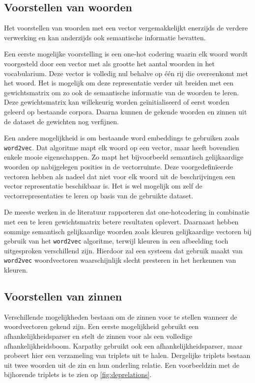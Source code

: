 \subsection{Voorstellen van woorden}
 Het voorstellen van woorden met een vector vergemakkelijkt enerzijds de verdere verwerking en kan anderzijds ook semantische informatie bevatten.

 Een eerste mogelijke voorstelling is een one-hot codering waarin elk woord wordt voorgesteld door een vector met als grootte het aantal woorden in het vocabularium. Deze vector is volledig nul behalve op \'e\'en rij die overeenkomt met het woord. Het is mogelijk om deze representatie verder uit breiden met een gewichtsmatrix om zo ook de semantische informatie van de woorden te leren. Deze gewichtsmatrix kan willekeurig worden ge\"initialiseerd of eerst worden geleerd op bestaande corpora\cite{Lebret2013,Mao2014a,Google}. Daarna kunnen de gekende woorden en zinnen uit de dataset de gewichten nog verfijnen.  

 Een andere mogelijkheid is om bestaande word embeddings te gebruiken zoals \texttt{word2vec}. Dat algoritme mapt elk woord op een vector, maar heeft bovendien enkele mooie eigenschappen. Zo mapt het bijvoorbeeld semantisch gelijkaardige woorden op nabijgelegen posities in de vectorruimte\cite{Mikolov2013}. Deze voorgedefin\"ieerde vectoren hebben als nadeel dat niet voor elk woord uit de beschrijvingen een vector representatie beschikbaar is. Het is wel mogelijk om zelf de vectorrepresentaties te leren op basis van de gebruikte dataset.

 De meeste werken in de literatuur rapporteren dat one-hotcodering in combinatie met een te leren gewichtsmatrix betere resultaten oplevert. Daarnaast hebben sommige semantisch gelijkaardige woorden zoals kleuren gelijkaardige vectoren bij gebruik van het \texttt{word2vec} algoritme, terwijl kleuren in een afbeelding toch uitgesproken verschillend zijn. Hierdoor zal een systeem dat gebruik maakt van \texttt{word2vec} woordvectoren waarschijnlijk slecht presteren in het herkennen van kleuren\cite{Karpathy2015}.
 
\subsection{Voorstellen van zinnen}
 Verschillende mogelijkheden bestaan om de zinnen voor te stellen wanneer de woordvectoren gekend zijn. Een eerste mogelijkheid gebruikt een afhankelijkheidsparser en stelt de zinnen voor als een volledige afhankelijkheidsboom\cite{Socher2014}. Karpathy\cite{Karpathy2014} gebruikt ook een afhankelijkheidsparser, maar probeert hier een verzameling van triplets uit te halen. Dergelijke triplets bestaan uit twee woorden uit de zin en hun onderling relatie. Een voorbeeldzin met de bijhorende triplets is te zien op \ref{fig:deprelations}.

